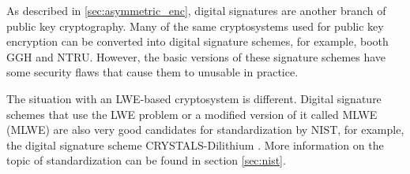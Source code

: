 As described in \ref{sec:asymmetric_enc}, digital signatures are another branch of public key cryptography. Many of the same cryptosystems used for public key encryption can be converted into digital signature schemes, for example, booth GGH and NTRU. However, the basic versions of these signature schemes have some security flaws that cause them to unusable in practice. \cite{Bernstein2009}

The situation with an LWE-based cryptosystem is different. Digital signature schemes that use the LWE problem or a modified version of it called MLWE (\acl{MLWE}) are also very good candidates for standardization by NIST, for example, the digital signature scheme CRYSTALS-Dilithium \cite{Grimes2020}. More information on the topic of standardization can be found in section \ref{sec:nist}.
